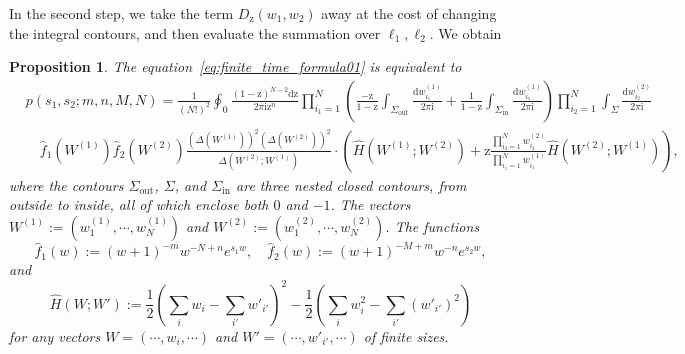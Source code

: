 \documentclass{article}
\newtheorem{prop}[thm]{Proposition}
\numberwithin{equation}{section}
\newcommand{\ddbar}[2]{\frac{{\mathrm d}#1}{2\pi {\mathrm i}#2}}
\newcommand{\inn}{\mathrm{in}}
\newcommand{\out}{\mathrm{out}}
\newcommand{\rz}{\mathrm{z}}
\begin{document}
In the second step, we take the term  $D_\rz(w_1,w_2)$ away at the cost of changing the integral contours, and then evaluate the summation over $\ell_1,\ell_2$. We obtain
\begin{prop}
	\label{prop:p_step2}
	The equation~\eqref{eq:finite_time_formula01} is equivalent to
	\begin{equation}
		\label{eq:finite_time_formula02}
		\begin{split}
		&p(s_1,s_2;m,n,M,N)=\frac{1}{(N!)^2} 
	 	 \oint_0  \frac{ (1-\rz)^{N-2} \mathrm{d}\rz }
		               { 2\pi\mathrm{i} \rz^n }
		          \prod_{i_1=1}^N \left(
		                              \frac{-\rz}{1-\rz} \int_{\Sigma_{\out}}
		                                                 \ddbar{w_{i_1}^{(1)}}{}
		                             +\frac{1}{1-\rz}  \int_{\Sigma_{\inn}}
		                                               \ddbar{w_{i_1}^{(1)}}{}
		                          \right)
		          \prod_{i_2=1}^N \int_{\Sigma} \ddbar{w_{i_2}^{(2)}}{}\\
		 &\quad 
		        \hat f_1\left(W^{(1)}\right)
		        \hat f_2\left(W^{(2)}\right)
		        \frac{ \left( \Delta\left(W^{(1)}\right) \right)^2 
		 	           \left( \Delta\left(W^{(2)}\right) \right)^2
	 	             }
		             { \Delta\left(W^{(2)};W^{(1)}\right)
		             }
	             \cdot 
	             \left(
	               \hat H \left(W^{(1)};W^{(2)}\right)
	                + \rz \frac{\prod_{i_2=1}^N w_{i_2}^{(2)}}
	                           {\prod_{i_1=1}^N w_{i_1}^{(1)}}
	                      \hat H \left(W^{(2)}; W^{(1)}\right)
	             \right),
		\end{split}
	\end{equation}
where the contours $\Sigma_\out$, $\Sigma$, and $\Sigma_{\inn}$ are three nested closed contours, from outside to inside, all of which enclose both $0$ and $-1$. The vectors $W^{(1)}:=(w_1^{(1)},\cdots,w_N^{(1)})$ and $W^{(2)}:=(w_1^{(2)},\cdots,w_N^{(2)})$. The functions
\begin{equation}
	\label{eq:hat_f}
	\hat f_1(w):= (w+1)^{-m} w^{-N+n} e^{s_1 w},\quad 
	\hat f_2(w):= (w+1)^{-M+m} w^{-n} e^{s_2 w},
\end{equation}
and
\begin{equation}
	\label{eq:hat_H}
	\hat H\left(W;W'\right):= 
	   \frac{1}{2} \left(
	                   \sum_i w_i -\sum_{i'} w'_{i'}  
	               \right)^2
	   -\frac{1}{2} \left(
	                  \sum_i w_i^2 -\sum_{i'} \left(w'_{i'}\right)^2  
	                \right)
\end{equation}
for any vectors $W=(\cdots,w_i,\cdots)$ and $W'=(\cdots,w'_{i'},\cdots)$ of finite sizes.
\end{prop}
\end{document}
